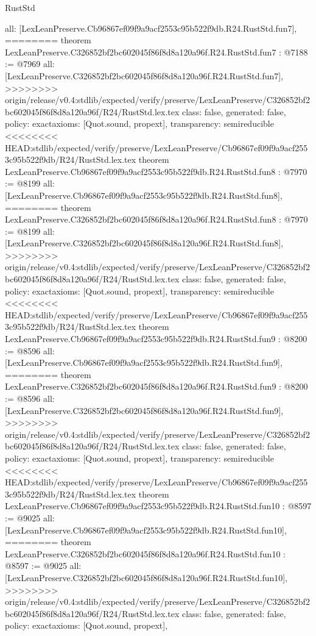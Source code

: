 \begin{lexlean}{RustStd}
\begin{coremodule}
{\begin{coremodule}
{{{{{{{{{{  all: [LexLeanPreserve.Cb96867ef09f9a9acf2553c95b522f9db.R24.RustStd.fun7],
========
theorem LexLeanPreserve.C326852bf2bc602045f86f8d8a120a96f.R24.RustStd.fun7 : @7188 := @7969 {
  all: [LexLeanPreserve.C326852bf2bc602045f86f8d8a120a96f.R24.RustStd.fun7],
>>>>>>>> origin/release/v0.4:stdlib/expected/verify/preserve/LexLeanPreserve/C326852bf2bc602045f86f8d8a120a96f/R24/RustStd.lex.tex
  class: false,
  generated: false,
  policy: exact{axioms: [Quot.sound, propext]},
  transparency: semireducible
}
<<<<<<<< HEAD:stdlib/expected/verify/preserve/LexLeanPreserve/Cb96867ef09f9a9acf2553c95b522f9db/R24/RustStd.lex.tex
theorem LexLeanPreserve.Cb96867ef09f9a9acf2553c95b522f9db.R24.RustStd.fun8 : @7970 := @8199 {
  all: [LexLeanPreserve.Cb96867ef09f9a9acf2553c95b522f9db.R24.RustStd.fun8],
========
theorem LexLeanPreserve.C326852bf2bc602045f86f8d8a120a96f.R24.RustStd.fun8 : @7970 := @8199 {
  all: [LexLeanPreserve.C326852bf2bc602045f86f8d8a120a96f.R24.RustStd.fun8],
>>>>>>>> origin/release/v0.4:stdlib/expected/verify/preserve/LexLeanPreserve/C326852bf2bc602045f86f8d8a120a96f/R24/RustStd.lex.tex
  class: false,
  generated: false,
  policy: exact{axioms: [Quot.sound, propext]},
  transparency: semireducible
}
<<<<<<<< HEAD:stdlib/expected/verify/preserve/LexLeanPreserve/Cb96867ef09f9a9acf2553c95b522f9db/R24/RustStd.lex.tex
theorem LexLeanPreserve.Cb96867ef09f9a9acf2553c95b522f9db.R24.RustStd.fun9 : @8200 := @8596 {
  all: [LexLeanPreserve.Cb96867ef09f9a9acf2553c95b522f9db.R24.RustStd.fun9],
========
theorem LexLeanPreserve.C326852bf2bc602045f86f8d8a120a96f.R24.RustStd.fun9 : @8200 := @8596 {
  all: [LexLeanPreserve.C326852bf2bc602045f86f8d8a120a96f.R24.RustStd.fun9],
>>>>>>>> origin/release/v0.4:stdlib/expected/verify/preserve/LexLeanPreserve/C326852bf2bc602045f86f8d8a120a96f/R24/RustStd.lex.tex
  class: false,
  generated: false,
  policy: exact{axioms: [Quot.sound, propext]},
  transparency: semireducible
}
<<<<<<<< HEAD:stdlib/expected/verify/preserve/LexLeanPreserve/Cb96867ef09f9a9acf2553c95b522f9db/R24/RustStd.lex.tex
theorem LexLeanPreserve.Cb96867ef09f9a9acf2553c95b522f9db.R24.RustStd.fun10 : @8597 := @9025 {
  all: [LexLeanPreserve.Cb96867ef09f9a9acf2553c95b522f9db.R24.RustStd.fun10],
========
theorem LexLeanPreserve.C326852bf2bc602045f86f8d8a120a96f.R24.RustStd.fun10 : @8597 := @9025 {
  all: [LexLeanPreserve.C326852bf2bc602045f86f8d8a120a96f.R24.RustStd.fun10],
>>>>>>>> origin/release/v0.4:stdlib/expected/verify/preserve/LexLeanPreserve/C326852bf2bc602045f86f8d8a120a96f/R24/RustStd.lex.tex
  class: false,
  generated: false,
  policy: exact{axioms: [Quot.sound, propext]},
}}}}}}}}}}}}}}
\end{coremodule}}
\end{coremodule}
\end{lexlean}
